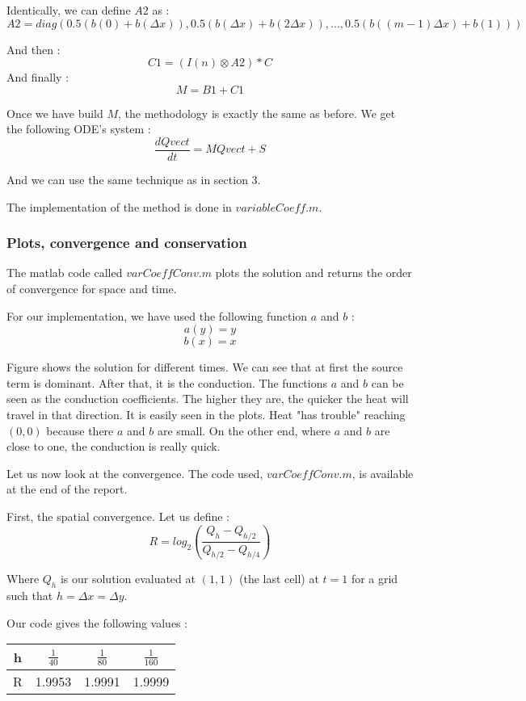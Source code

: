 Identically, we can define $A2$ as :
$$A2 = diag(0.5(b(0)+b(\Delta x)),0.5(b(\Delta x)+b(2\Delta x)),...,0.5(b((m-1)\Delta x)+b(1)))$$

And then : 
$$C1 = (I(n)\otimes A2)*C$$
And finally : 
$$M = B1 + C1$$

Once we have build $M$, the methodology is exactly the same as before. We get the following ODE's system :
$$\frac{dQvect}{dt} = MQvect + S$$

And we can use the same technique as in section 3.

The implementation of the method is done in $variableCoeff.m$.

\subsubsection{Plots, convergence and conservation}
The matlab code called $varCoeffConv.m$ plots the solution and returns the order of convergence for space and time.

For our implementation, we have used the following function $a$ and $b$ : 
$$a(y) = y$$
$$b(x) = x$$

Figure  shows the solution for different times. We can see that at first the source term is dominant. After that, it is the conduction. The functions $a$ and $b$ can be seen as the conduction coefficients. The higher they are, the quicker the heat will travel in that direction. It is easily seen in the plots. Heat "has trouble" reaching $(0,0)$ because there $a$ and $b$ are small. On the other end, where $a$ and $b$ are close to one, the conduction is really quick.

Let us now look at the convergence. The code used, $varCoeffConv.m$, is available at the end of the report.

First, the spatial convergence. Let us define :
$$R = log_2(\frac{Q_h-Q_{h/2}}{Q_{h/2}-Q_{h/4}})$$

Where $Q_h$ is our solution evaluated at $(1,1)$ (the last cell) at $t=1$ for a grid such that $h=\Delta x= \Delta y$.

Our code gives the following values : 
\begin{center}
\begin{tabular}{|c|c|c|c|}
\hline 
h & $\frac{1}{40}$ & $\frac{1}{80}$ & $\frac{1}{160}$ \\ 
\hline 
R & 1.9953 & 1.9991 & 1.9999 \\ 
\hline 
\end{tabular} 
\end{center}

